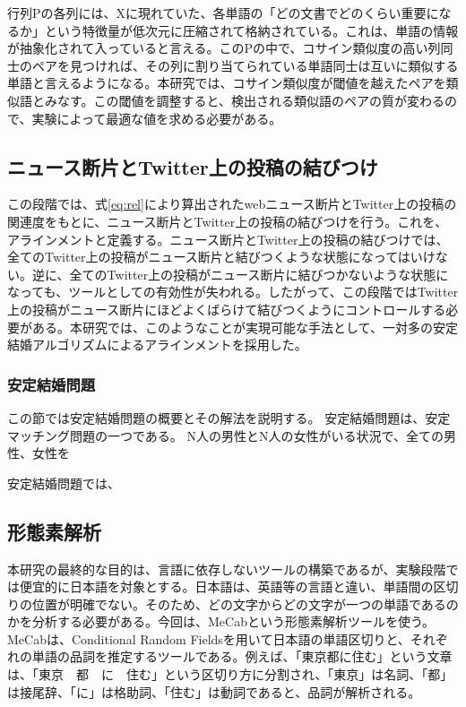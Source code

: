 \documentclass[12pt]{jarticle}
\begin{document}
行列Pの各列には、Xに現れていた、各単語の「どの文書でどのくらい重要になるか」という特徴量が低次元に圧縮されて格納されている。これは、単語の情報が抽象化されて入っていると言える。このPの中で、コサイン類似度の高い列同士のペアを見つければ、その列に割り当てられている単語同士は互いに類似する単語と言えるようになる。本研究では、コサイン類似度が閾値を越えたペアを類似語とみなす。この閾値を調整すると、検出される類似語のペアの質が変わるので、実験によって最適な値を求める必要がある。

\subsection{ニュース断片とTwitter上の投稿の結びつけ}
この段階では、式\ref{eq:rel}により算出されたwebニュース断片とTwitter上の投稿の関連度をもとに、ニュース断片とTwitter上の投稿の結びつけを行う。これを、アラインメントと定義する。ニュース断片とTwitter上の投稿の結びつけでは、全てのTwitter上の投稿がニュース断片と結びつくような状態になってはいけない。逆に、全てのTwitter上の投稿がニュース断片に結びつかないような状態になっても、ツールとしての有効性が失われる。したがって、この段階ではTwitter上の投稿がニュース断片にほどよくばらけて結びつくようにコントロールする必要がある。本研究では、このようなことが実現可能な手法として、一対多の安定結婚アルゴリズム\cite{psmp}によるアラインメントを採用した。

\subsubsection{安定結婚問題}
この節では安定結婚問題の概要とその解法を説明する。
安定結婚問題\cite{smp}は、安定マッチング問題の一つである。
N人の男性とN人の女性がいる状況で、全ての男性、女性を


安定結婚問題では、


\subsection{形態素解析}
本研究の最終的な目的は、言語に依存しないツールの構築であるが、実験段階では便宜的に日本語を対象とする。日本語は、英語等の言語と違い、単語間の区切りの位置が明確でない。そのため、どの文字からどの文字が一つの単語であるのかを分析する必要がある。今回は、MeCab\cite{MeCab}という形態素解析ツールを使う。MeCabは、Conditional Random Fieldsを用いて日本語の単語区切りと、それぞれの単語の品詞を推定するツールである。例えば、「東京都に住む」という文章は、「東京　都　に　住む」という区切り方に分割され、「東京」は名詞、「都」は接尾辞、「に」は格助詞、「住む」は動詞であると、品詞が解析される。
\end{document}
